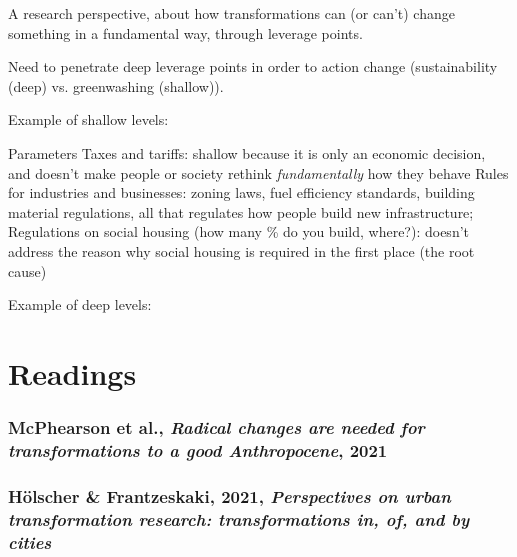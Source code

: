 \documentclass{article}
\begin{document}
A research perspective, about how transformations can (or can't) change something in a fundamental way, through leverage points.

Need to penetrate deep leverage points in order to action change (sustainability (deep) vs. greenwashing (shallow)).

Example of shallow levels: 
\begin{outline}
	\1 Parameters
		\2 Taxes and tariffs: shallow because it is only an economic decision, and doesn't make people or society rethink \textit{fundamentally} how they behave
		\2 Rules for industries and businesses: zoning laws, fuel efficiency standards, building material regulations, all that regulates how people build new infrastructure;
		\2 Regulations on social housing (how many \% do you build, where?): doesn't address the reason why social housing is required in the first place (the root cause)
\end{outline}

Example of deep levels: 
\begin{outline}
	\1 
\end{outline}

\pagebreak

\section{Readings}

\subsubsection{McPhearson et al., \textit{Radical changes are needed for transformations to a good Anthropocene}, 2021}

\subsubsection{Hölscher \& Frantzeskaki, 2021, \textit{Perspectives on urban transformation research: transformations in, of, and by cities}}
\end{document}
